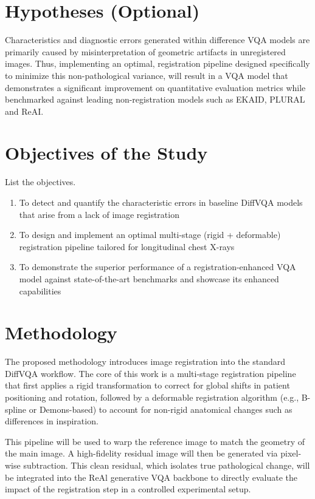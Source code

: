 \section{Hypotheses (Optional)}
Characteristics and diagnostic errors generated within difference VQA models are primarily caused by misinterpretation of geometric artifacts in unregistered images. Thus, implementing an optimal, registration pipeline designed specifically to minimize this non-pathological variance, will result in a VQA model that demonstrates a significant improvement on quantitative evaluation metrics while benchmarked against leading non-registration models such as EKAID, PLURAL and ReAI. 


\section{Objectives of the Study}

List the objectives.
\begin{enumerate}
    \item To detect and quantify the characteristic errors in baseline DiffVQA models that arise from a lack of image registration
    \item To design and implement an optimal multi-stage (rigid + deformable) registration pipeline tailored for longitudinal chest X-rays
    \item To demonstrate the superior performance of a registration-enhanced VQA model against state-of-the-art benchmarks and showcase its enhanced capabilities
\end{enumerate}

\section{Methodology}
The proposed methodology introduces image registration into the standard DiffVQA workflow. The core of this work is a multi-stage registration pipeline that first applies a rigid transformation to correct for global shifts in patient positioning and rotation, followed by a deformable registration algorithm (e.g., B-spline or Demons-based) to account for non-rigid anatomical changes such as differences in inspiration. 

This pipeline will be used to warp the reference image to match the geometry of the main image. A high-fidelity residual image will then be generated via pixel-wise subtraction. This clean residual, which isolates true pathological change, will be integrated into the ReAl generative VQA backbone to directly evaluate the impact of the registration step in a controlled experimental setup.

